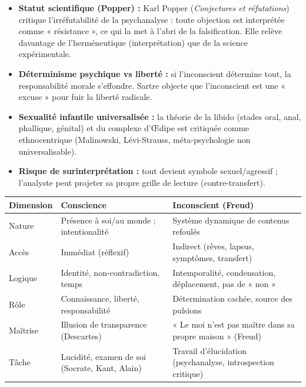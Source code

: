\documentclass[11pt]{article}
\begin{document}
\begin{propriete}
\begin{itemize}
\item \textbf{Statut scientifique (Popper) :} Karl Popper (\emph{Conjectures et réfutations}) critique l'irréfutabilité de la psychanalyse : toute objection est interprétée comme « résistance », ce qui la met à l'abri de la falsification. Elle relève davantage de l'herméneutique (interprétation) que de la science expérimentale.
\item \textbf{Déterminisme psychique vs liberté :} si l'inconscient détermine tout, la responsabilité morale s'effondre. Sartre objecte que l'inconscient est une « excuse » pour fuir la liberté radicale.
\item \textbf{Sexualité infantile universalisée :} la théorie de la libido (stades oral, anal, phallique, génital) et du complexe d'Œdipe est critiquée comme ethnocentrique (Malinowski, Lévi-Strauss, méta-psychologie non universalisable).
\item \textbf{Risque de surinterprétation :} tout devient symbole sexuel/agressif ; l'analyste peut projeter sa propre grille de lecture (contre-transfert).
\end{itemize}
\end{propriete}

\begin{aretenir}
\begin{center}
\begin{tabularx}{\linewidth}{|l|X|X|}\hline
\textbf{Dimension} & \textbf{Conscience} & \textbf{Inconscient (Freud)} \\ \hline
Nature & Présence à soi/au monde ; intentionalité & Système dynamique de contenus refoulés \\ \hline
Accès & Immédiat (réflexif) & Indirect (rêves, lapsus, symptômes, transfert) \\ \hline
Logique & Identité, non-contradiction, temps & Intemporalité, condensation, déplacement, pas de « non » \\ \hline
Rôle & Connaissance, liberté, responsabilité & Détermination cachée, source des pulsions \\ \hline
Maîtrise & Illusion de transparence (Descartes) & « Le moi n'est pas maître dans sa propre maison » (Freud) \\ \hline
Tâche & Lucidité, examen de soi (Socrate, Kant, Alain) & Travail d'élucidation (psychanalyse, introspection critique) \\ \hline
\end{tabularx}
\end{center}
\end{aretenir}
\end{document}
